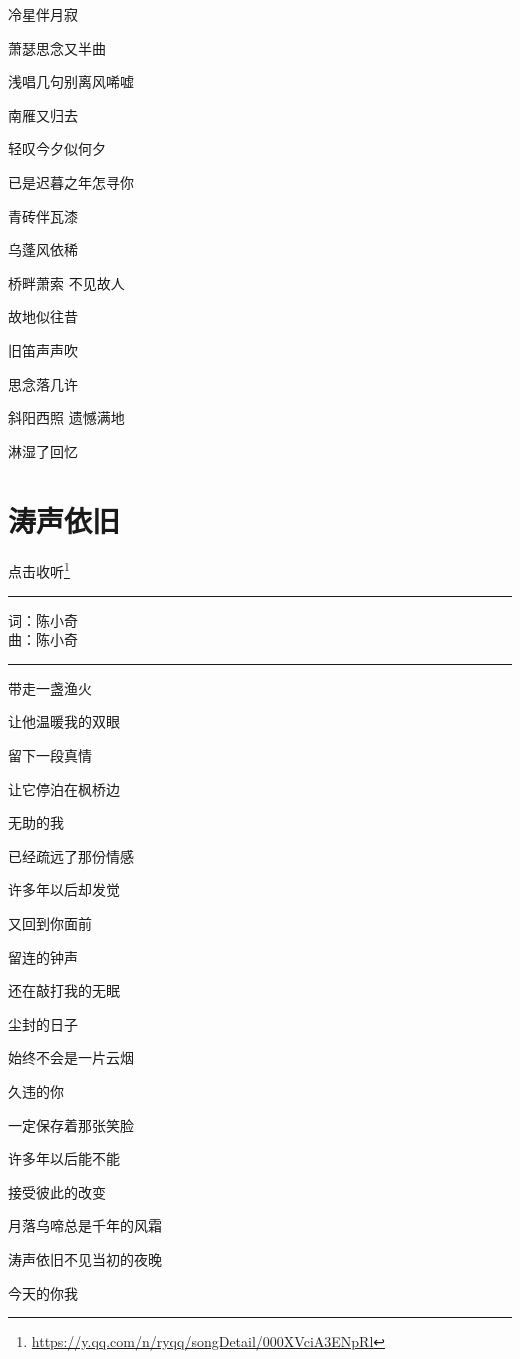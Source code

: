 \documentclass[]{ctexbook}
\renewcommand{\href}[2]{#2\footnote{\url{#1}}}
\begin{document}
冷星伴月寂

萧瑟思念又半曲

浅唱几句别离风唏嘘

南雁又归去

轻叹今夕似何夕

已是迟暮之年怎寻你

青砖伴瓦漆

乌蓬风依稀

桥畔萧索 不见故人

故地似往昔

旧笛声声吹

思念落几许

斜阳西照 遗憾满地

淋湿了回忆

\section*{涛声依旧}\label{taoshengyijiu}


\href{https://y.qq.com/n/ryqq/songDetail/000XVciA3ENpRl}{点击收听}

\begin{center}\rule{0.5\linewidth}{0.5pt}\end{center}

词：陈小奇\\
曲：陈小奇

\begin{center}\rule{0.5\linewidth}{0.5pt}\end{center}

带走一盏渔火

让他温暖我的双眼

留下一段真情

让它停泊在枫桥边

无助的我

已经疏远了那份情感

许多年以后却发觉

又回到你面前

留连的钟声

还在敲打我的无眠

尘封的日子

始终不会是一片云烟

久违的你

一定保存着那张笑脸

许多年以后能不能

接受彼此的改变

月落乌啼总是千年的风霜

涛声依旧不见当初的夜晚

今天的你我
\end{document}
